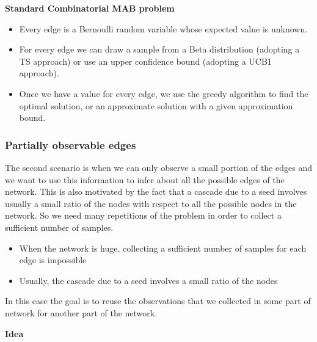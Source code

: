 \documentclass[10pt,a4paper]{article}
\begin{document}
\textbf{Standard Combinatorial MAB problem}

\begin{itemize}

\item Every edge is a Bernoulli random variable whose expected value is unknown.
\item For every edge we can draw a sample from a Beta distribution (adopting a TS approach) or use an upper confidence bound (adopting a UCB1  approach).
\item Once we have a value for every edge, we use the greedy algorithm to find the optimal solution, or an approximate solution with a given approximation bound.
\end{itemize}

\subsubsection{Partially observable edges}\label{partially-observable-edges}

The second scenario is when we can only observe a small portion of the edges and we want to use this information to infer about all the possible edges of the network. This is also motivated by the fact that a cascade due to a seed involves usually a small ratio of the nodes with respect to all the possible nodes in the network. So we need many repetitions of the problem in order to collect a sufficient number of samples.

\begin{itemize}

\item When the network is huge, collecting a sufficient number of samples for each edge is impossible
\item Usually, the cascade due to a seed involves a small ratio of the nodes
\end{itemize}

In this case the goal is to reuse the observations that we collected in some part of network for another part of the network.
\newline

\textbf{Idea}
\end{document}
